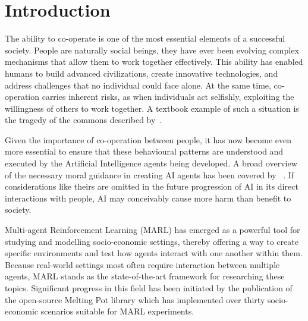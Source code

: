 \documentclass[preprint,12pt,authoryear]{elsarticle}
\begin{document}
\section{Introduction}

The ability to co-operate is one of the most essential elements of a successful society. People are naturally social beings, they have ever been evolving complex mechanisms that allow them to work together effectively. This ability has enabled humans to build advanced civilizations, create innovative technologies, and address challenges that no individual could face alone. At the same time, co-operation carries inherent risks, as when individuals act selfishly, exploiting the willingness of others to work together. A textbook example of such a situation is the tragedy of the commons described by~\cite{hardin1968tragedy}. 

Given the importance of co-operation between people, it has now become even more essential to ensure that these behavioural patterns are understood and executed by the Artificial Intelligence agents being developed. A broad overview of the necessary moral guidance in creating AI agents has been covered by ~\cite{Bostrom2018}. If considerations like theirs are omitted in the future progression of AI in its direct interactions with people, AI may conceivably cause more harm than benefit to society.

Multi-agent Reinforcement Learning (MARL) has emerged as a powerful tool for studying and modelling socio-economic settings, thereby offering a way to create specific environments and test how agents interact with one another within them. Because real-world settings most often require interaction between multiple agents, MARL stands as the state-of-the-art framework for researching these topics. Significant progress in this field has been initiated by the publication of the open-source Melting Pot library \citep{Leibo2021, agapiou2023meltingpot20} which has implemented over thirty socio-economic scenarios suitable for MARL experiments.
\end{document}
